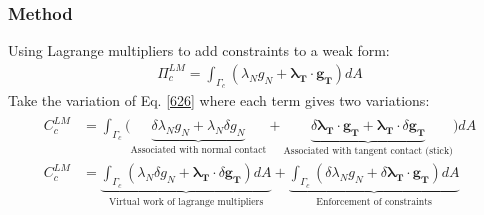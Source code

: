 \documentclass[12pt,3p]{article}
\numberwithin{equation}{section}
\begin{document}
\subsubsection{Method}
Using Lagrange multipliers to add constraints to a weak form:
\begin{align}\label{626}
\Pi_c^{LM} = \int_{\Gamma_c} (\lambda_N g_N + \mathbf{\lambda_T} \cdot \mathbf{g_T}) dA
\end{align}
Take the variation of Eq. \ref{626} where each term gives two variations:
\begin{align}
\begin{split}
C_c^{LM} &= \int_{\Gamma_c} \big( \underbrace{ \delta \lambda_N g_N + \lambda_N \delta g_N}_\text{Associated with normal contact} + \underbrace{\delta \mathbf{\lambda_T} \cdot \mathbf{g_T} + \mathbf{\lambda_T} \cdot \delta \mathbf{g_T}}_\text{Associated with tangent contact (stick)} \big) dA \\
C_c^{LM} &= \underbrace{\int_{\Gamma_c} (\lambda_N \delta g_N + \mathbf{\lambda_T} \cdot \delta \mathbf{g_T}) dA}_\text{Virtual work of lagrange multipliers} + \underbrace{\int_{\Gamma_c} (\delta \lambda_N g_N + \delta \mathbf{\lambda_T} \cdot \mathbf{g_T}) dA}_\text{Enforcement of constraints}
\end{split}
\end{align}
\end{document}
